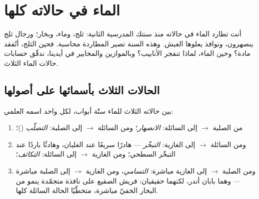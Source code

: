 \chapter{الماء في حالاته كلها}\label{ch:g6:water-states}

أنت تطارد الماء في حالاته منذ سنتك المدرسية الثانية: ثلج، وماء،
وبخار؛ ورجال ثلج ينصهرون، ونوافذ يعلوها الغبش. وهذه السنة تصير
المطاردة محاسبة. فحين  الثلج، أتُفقد مادة؟ وحين 
الماء، لماذا تنفجر الأنابيب؟ وبالموازين والمخابير في أيدينا،
ندقّق حسابات حالات الماء الثلاث.

\section{الحالات الثلاث بأسمائها على أصولها}

\begin{definition}\label{def:g6:water-states:changes}
بين حالاته الثلاث للماء ستّة أبواب، لكل واحد اسمه العلمي:
\begin{enumerate}
  \item من الصلبة $\to$ إلى السائلة:
        \emph{الانصهار}؛ ومن السائلة $\to$ إلى
        الصلبة: \emph{التصلّب} ()؛
  \item ومن السائلة $\to$ إلى الغازية:
        \emph{التبخّر} --- هادرًا سريعًا عند
        الغليان، وهادئًا باردًا عند التبخّر السطحي؛ ومن الغازية
        $\to$ إلى السائلة: \emph{التكاثف}؛
  \item ومن الصلبة $\to$ إلى الغازية مباشرة:
        \emph{التسامي}، ومن الغازية $\to$ إلى
        الصلبة مباشرة --- وهما بابان أندر، لكنهما حقيقيان: فريش
        الصقيع على نافذة متجمّدة ينمو من البخار الخفيّ مباشرة،
        متخطّيًا الحالة السائلة كلها.
\end{enumerate}
\end{definition}

